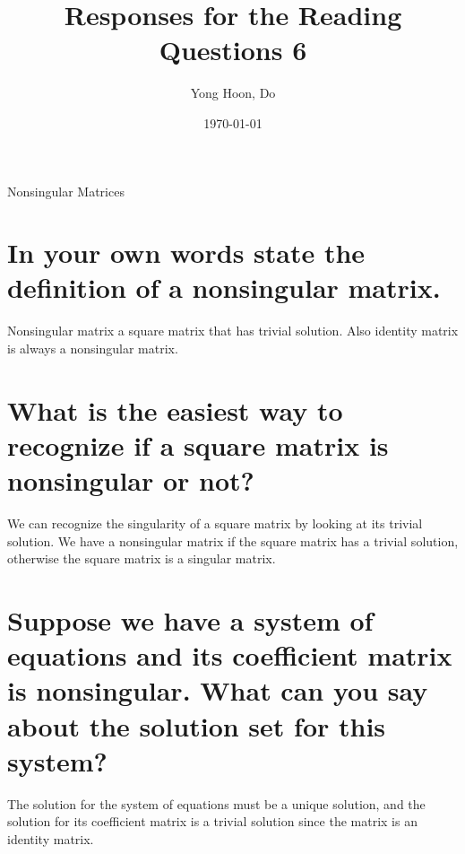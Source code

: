\documentclass{article}
\title{Responses for the Reading Questions 6}
\author{Yong Hoon, Do}
\date{\today}
\begin{document}
\maketitle

\begin{center}
Nonsingular Matrices
\end{center}

\section{In your own words state the definition of a nonsingular matrix.}
Nonsingular matrix a square matrix that has trivial solution. Also identity matrix is always a nonsingular matrix.

\section{What is the easiest way to recognize if a square matrix is nonsingular or not?}
We can recognize the singularity of a square matrix by looking at its trivial solution.
We have a nonsingular matrix if the square matrix has a trivial solution,
otherwise the square matrix is a singular matrix.

\section{Suppose we have a system of equations and its coefficient matrix is nonsingular. What can you say about the solution set for this system?}
The solution for the system of equations must be a unique solution,
and the solution for its coefficient matrix is a trivial solution
since the matrix is an identity matrix.
\end{document}
